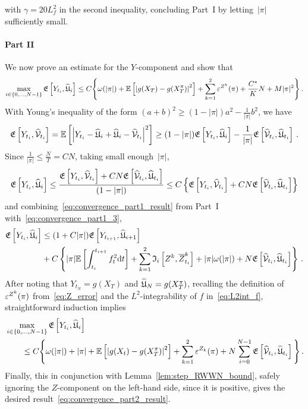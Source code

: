 with $\gamma = 20 L_f^2$ in the second inequality, concluding Part~I by letting~$|\pi|$ sufficiently small.

\paragraph{\textbf{Part II}} 
We now prove an estimate for the $Y$-component and show that
\begin{align}\label{eq:convergence_part2_result}
\max_{i\in\{0,\dots,N-1\}} 
\mathfrak{E}\left[Y_{t_i}, \widehat{\mathfrak{U}}_{i}\right] \leq C\Bigg\{\omega(|\pi|) + \mathbb{E}\left[\left|g(X_T)-g(X^\pi_T)\right|^2\right]+\sum_{k=1}^2\varepsilon^{Z^k}(\pi)+\frac{C^{*}}{K}N + M|\pi|^2\Bigg\}\,.
\end{align}
With Young's inequality of the form $(a+b)^2\geq (1-|\pi|)a^2 - \frac1{|\pi|} b^2$,
we have
\begin{equation}
\mathfrak{E}\left[Y_{t_i}, \widehat{\mathcal{V}}_{t_i}\right] = \mathbb{E}\left[\left|Y_{t_i} - \widehat{\mathfrak{U}}_i + \widehat{\mathfrak{U}}_i - \widehat{\mathcal{V}}_{t_i}\right|^2\right] 
\geq (1-|\pi|)\mathfrak{E}\left[Y_{t_i}, \widehat{\mathfrak{U}}_{i}\right] - \frac1{|\pi|} \mathfrak{E}\left[\widehat{\mathcal{V}}_{t_i}, \widehat{\mathfrak{U}}_{t_i}\right]\,.
\end{equation}
Since $\frac1{|\pi|}\leq \frac{N}{T}=CN$,
taking small enough~$|\pi|$, 
\begin{equation}\label{eq:convergence_part1_3}
\mathfrak{E}\left[Y_{t_i}, \widehat{\mathfrak{U}}_{i}\right] \leq \frac{\mathfrak{E}\left[Y_{t_i}, \widehat{\mathcal{V}}_{t_i}\right] + CN \mathfrak{E}\left[\widehat{\mathcal{V}}_{t_i}, \widehat{\mathfrak{U}}_{t_i}\right]}{(1-|\pi|)}
    \leq C \left\{
\mathfrak{E}\left[Y_{t_i}, \widehat{\mathcal{V}}_{t_i}\right] + CN \mathfrak{E}\left[\widehat{\mathcal{V}}_{t_i}, \widehat{\mathfrak{U}}_{t_i}\right]\right\}
\end{equation}
and combining~\eqref{eq:convergence_part1_result} from Part~I with~\eqref{eq:convergence_part1_3},
\begin{align*}
 \mathfrak{E}\left[Y_{t_i}, \widehat{\mathfrak{U}}_{i}\right] & \leq (1+C|\pi|) \mathfrak{E}\left[Y_{t_{i+1}}, \widehat{\mathfrak{U}}_{i+1}\right] \\
 & + C\left\{|\pi| \mathbb{E}\left[\int_{t_i}^{t_{i+1}}f_{t}^2 \mathrm{d} t\right] + \sum_{k=1}^{2}\mathfrak{I}_i\left[Z^k, \overline{Z}^{k}_{t_i}\right] + |\pi|\omega(|\pi|) + N\mathfrak{E}\left[\widehat{\mathcal{V}}_{t_i}, \widehat{\mathfrak{U}}_{t_i}\right]
  \right\}\,.
\end{align*}
After noting that $Y_{t_N}= g(X_T)$ and $\widehat{\mathfrak{U}}_N= g(X^\pi_T)$, recalling the definition of $\varepsilon^{Z^k}(\pi)$ from~\eqref{eq:Z_error} and the $L^2$-integrability of $f$ in~\eqref{eq:L2int_f}, 
straightforward induction implies
\begin{align*}
&\max_{i\in\{0, \dots, N-1\}}\mathfrak{E}\left[Y_{t_i}, \widehat{\mathfrak{U}}_{i}\right] \\
&\qquad\leq C\Bigg\{\omega(|\pi|) + |\pi| + \mathbb{E}\left[\left|g(X_t)-g(X^\pi_T)\right|^2\right] + \sum_{k=1}^2\varepsilon^{Z_k}(\pi)
 + N\sum_{i=0}^{N-1}\mathfrak{E}\left[\widehat{\mathcal{V}}_{t_i}, \widehat{\mathfrak{U}}_{t_i}\right]\Bigg\}\,.
\end{align*}
Finally, this in conjunction with Lemma~\ref{lem:step_RWWN_bound}, safely ignoring the $Z$-component on the left-hand side, since it is positive, gives the desired result~\eqref{eq:convergence_part2_result}.

